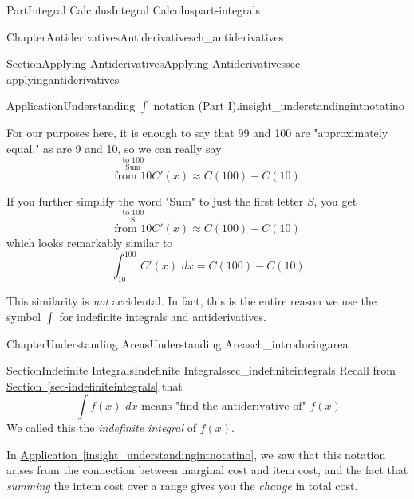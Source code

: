 \documentclass{tufte-book}
\newcommand{\xreffont}{\relax}
\numberwithin{equation}{chapter}
\newcommand{\intdx}[1]{{\,\int#1\,\,dx}}
\begin{document}
\begin{partptx}{Part}{Integral Calculus}{}{Integral Calculus}{}{}{part-integrals}
\begin{chapterptx}{Chapter}{Antiderivatives}{}{Antiderivatives}{}{}{ch_antiderivatives}
\begin{sectionptx}{Section}{Applying Antiderivatives}{}{Applying Antiderivatives}{}{}{sec-applyingantiderivatives}
\begin{insight}{Application}{Understanding \(\int\) notation (Part I).}{insight_understandingintnotatino}
\par
For our purposes here, it is enough to say that 99 and 100 are "approximately equal," as are 9 and 10, so we can really say%
\begin{equation*}
\stackrel{ \scriptstyle\text{to 100} }{  \stackrel{\textstyle\text{Sum}}{ \scriptstyle\text{from 10} }  } C'(x)
\approx
C(100) - C(10)
\end{equation*}
%
\par
If you further simplify the word "Sum" to just the first letter \(S\), you get%
\begin{equation*}
\stackrel{ \scriptstyle\text{to 100} }{  \stackrel{\textstyle\text{S}}{ \scriptstyle\text{from 10} }  } C'(x)
\approx
C(100) - C(10)
\end{equation*}
which looks remarkably similar to%
\begin{equation*}
\intdx{_{10}^{100} \, C'(x)} = C(100) - C(10)
\end{equation*}
%
\par
This similarity is \emph{not} accidental. In fact, this is the entire reason we use the symbol \(\int\) for indefinite integrals and antiderivatives.%
\end{insight}
\end{sectionptx}
\end{chapterptx}
%
\typeout{************************************************}
\typeout{************************************************}
%
\begin{chapterptx}{Chapter}{Understanding Areas}{}{Understanding Areas}{}{}{ch_introducingarea}
\renewcommand*{\chaptername}{Chapter}
%
%
\typeout{************************************************}
\typeout{************************************************}
%
\begin{sectionptx}{Section}{Indefinite Integrals}{}{Indefinite Integrals}{}{}{sec_indefiniteintegrals}
Recall from \hyperref[sec-indefiniteintegrals]{Section~{\xreffont\ref{sec-indefiniteintegrals}}} that%
\begin{equation*}
\intdx{f(x)} \text{ means "find the antiderivative of" } f(x) 
\end{equation*}
We called this the \emph{indefinite integral} of \(f(x)\).%
\par
In \hyperref[insight_understandingintnotatino]{Application~{\xreffont\ref{insight_understandingintnotatino}}}, we saw that this notation arises from the connection between marginal cost and item cost, and the fact that \emph{summing} the intem cost over a range gives you the \emph{change} in total cost.%

\end{sectionptx}
\end{chapterptx}
\end{partptx}
\end{document}
